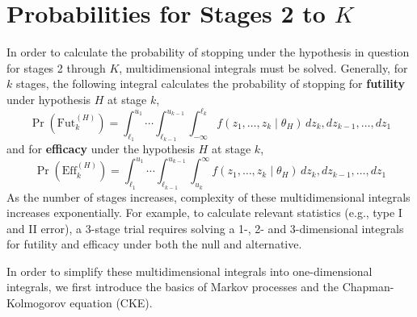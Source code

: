 \documentclass{article}
\begin{document}
\section{Probabilities for Stages 2 to \texorpdfstring{$K$}{}}
%
In order to calculate the probability of stopping under the hypothesis in question for stages 2 through $K$, multidimensional integrals must be solved. Generally, for $k$ stages, the following integral calculates the probability of stopping for \textbf{futility} under hypothesis $H$ at stage $k$,
%
\begin{equation} \label{eq:fut_integral}
    \Pr\left(\mathrm{Fut}_k^{(H)}\right)=\int_{\ell_1}^{u_1} \cdots \int_{\ell_{k-1}}^{u_{k-1}}\int_{-\infty}^{\ell_k} f(z_1,\dots,z_k\mid\theta_H)\,dz_k,dz_{k-1},\dots,dz_1
\end{equation}
%
and for \textbf{efficacy} under the hypothesis $H$ at stage $k$,
%
\begin{equation} \label{eq:eff_integral}
    \Pr\left(\mathrm{Eff}_k^{(H)}\right)=\int_{\ell_1}^{u_1} \cdots \int_{\ell_{k-1}}^{u_{k-1}}\int_{u_k}^{\infty} f(z_1,\dots,z_k\mid\theta_H)\,dz_k,dz_{k-1},\dots,dz_1
\end{equation}
%
As the number of stages increases, complexity of these multidimensional integrals increases exponentially. For example, to calculate relevant statistics (e.g., type I and II error), a 3-stage trial requires solving a 1-, 2- and 3-dimensional integrals for futility and efficacy under both the null and alternative.

In order to simplify these multidimensional integrals into one-dimensional integrals, we first introduce the basics of Markov processes and the Chapman-Kolmogorov equation (CKE). 
\end{document}

